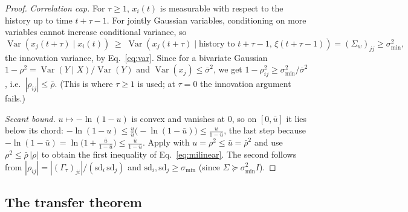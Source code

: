 \documentclass[11pt]{article}
\theoremstyle{definition}
\theoremstyle{remark}
\newcommand{\Var}{\operatorname{Var}}
\begin{document}
\begin{proof}
    \emph{Correlation cap.}
    For $\tau \geq 1$, $x_i(t)$ is measurable with respect to the history up
    to time $t + \tau - 1$.
    For jointly Gaussian variables, conditioning on more variables cannot
    increase conditional variance, so
    \[
        \Var\!\left(x_j(t{+}\tau) \mid x_i(t)\right)
        \;\geq\;
        \Var\!\left(x_j(t{+}\tau) \mid \text{history to } t{+}\tau{-}1,\,
        \xi(t{+}\tau{-}1)\right)
        = (\Sigma_w)_{jj} \geq \sigma_{\min}^2,
    \]
    the innovation variance, by Eq.~\eqref{eq:var}.
    Since for a bivariate Gaussian
    $1 - \rho^2 = \Var(Y \mid X) / \Var(Y)$ and
    $\Var(x_j) \leq \bar{\sigma}^2$, we get
    $1 - \rho_{ij}^2 \geq \sigma_{\min}^2 / \bar{\sigma}^2$, i.e.\
    $|\rho_{ij}| \leq \bar{\rho}$.
    (This is where $\tau \geq 1$ is used; at $\tau = 0$ the innovation
    argument fails.)

    \emph{Secant bound.}
    $u \mapsto -\ln(1 - u)$ is convex and vanishes at $0$, so on
    $[0, \bar{u}]$ it lies below its chord:
    $-\ln(1 - u) \leq \frac{u}{\bar{u}}\big(-\ln(1 - \bar{u})\big)
        \leq \frac{u}{1 - \bar{u}}$,
    the last step because
    $-\ln(1 - \bar{u}) = \ln\!\big(1 + \tfrac{\bar{u}}{1 - \bar{u}}\big) \leq
        \tfrac{\bar{u}}{1 - \bar{u}}$.
    Apply with $u = \rho^2 \leq \bar{u} = \bar{\rho}^2$ and use
    $\rho^2 \leq \bar{\rho}\,|\rho|$ to obtain the first inequality of
    Eq.~\eqref{eq:milinear}.
    The second follows from
    $|\rho_{ij}| = |(\Gamma_\tau)_{ji}| / (\mathrm{sd}_i\, \mathrm{sd}_j)$ and
    $\mathrm{sd}_i, \mathrm{sd}_j \geq \sigma_{\min}$
    (since $\Sigma \succeq \sigma_{\min}^2 I$).
\end{proof}

\subsection{The transfer theorem}
\label{sec:transferthm}
\end{document}
